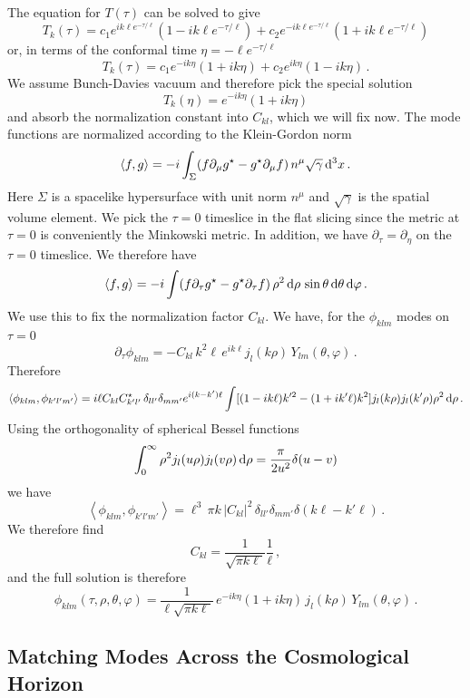 \documentclass{brownthesis}
\def\dd{{\rm d}}
\begin{document}
The equation for $T(\tau)$ can be solved to give
\[
T_{k}(\tau)=c_{1}e^{ik\ell e^{-\tau/\ell}}\left(1-ik\ell e^{-\tau/\ell}\right)+c_{2}e^{-ik\ell e^{-\tau/\ell}}\left(1+ik\ell e^{-\tau/\ell}\right)
\]
or, in terms of the conformal time $\eta=-\ell e^{-\tau/\ell}$
\[
T_{k}(\tau)=c_{1}e^{-ik\eta}\left(1+ik\eta\right)+c_{2}e^{ik\eta}\left(1-ik\eta\right)\,.
\]
We assume Bunch-Davies vacuum and therefore pick the special solution
\[
T_{k}(\eta)=e^{-ik\eta}\left(1+ik\eta\right)
\]
and absorb the normalization constant into $C_{kl}$, which we will
fix now. The mode functions are normalized according to the Klein-Gordon
norm
\[
\left\langle f,g\right\rangle =-i\int_{\Sigma}(f\partial_{\mu}g^{\star}-g^{\star}\partial_{\mu}f)\,n^{\mu}\sqrt{\gamma}\,\dd^{3}x\,.
\]
Here $\Sigma$ is a spacelike hypersurface with unit norm $n^{\mu}$
and $\sqrt{\gamma}$ is the spatial volume element. We pick the $\tau=0$
timeslice in the flat slicing since the metric at $\tau=0$ is conveniently
the Minkowski metric. In addition, we have $\partial_{\tau}=\partial_{\eta}$
on the $\tau=0$ timeslice. We therefore have
\[
\left\langle f,g\right\rangle =-i\int(f\partial_{\tau}g^{\star}-g^{\star}\partial_{\tau}f)\,\rho^{2}\,\dd\rho\,\sin\theta\,\dd\theta\,\dd\varphi\,.
\]
We use this to fix the normalization factor $C_{kl}$. We have, for
the $\phi_{klm}$ modes on $\tau=0$
\[
\partial_{\tau}\phi_{klm}=-C_{kl}\,k^{2}\ell\,e^{ik\ell}j_{l}(k\rho)\,Y_{lm}(\theta,\varphi)\,.
\]
Therefore
\[
\left\langle \phi_{klm},\phi_{k'l'm'}\right\rangle =i\ell C_{kl}C_{k'l'}^{\star}\,\delta_{ll'}\delta_{mm'}e^{i(k-k')\ell}\int[(1-ik\ell)k'^{2}-(1+ik'\ell)k^{2}]j_{l}(k\rho)j_{l}(k'\rho)\rho^{2}\,\dd\rho\,.
\]
Using the orthogonality of spherical Bessel functions
\[
\int_{0}^{\infty}\rho^{2}j_{l}(u\rho)j_{l}(v\rho)\,\dd\rho=\frac{\pi}{2u^{2}}\delta(u-v)
\]
we have
\[
\left\langle \phi_{klm},\phi_{k'l'm'}\right\rangle =\ell^{3}\,\pi k\,|C_{kl}|^{2}\,\delta_{ll'}\delta_{mm'}\delta(k\ell-k'\ell)\,.
\]
We therefore find
\[
C_{kl}=\frac{1}{\sqrt{\pi k\ell}}\frac{1}{\ell}\,,
\]
and the full solution is therefore
\[
\phi_{klm}(\tau,\rho,\theta,\varphi)=\frac{1}{\ell\sqrt{\pi k\ell}}\,e^{-ik\eta}(1+ik\eta)\,j_{l}(k\rho)\,Y_{lm}(\theta,\varphi)\,.
\]


\subsection{Matching Modes Across the Cosmological Horizon}
\end{document}
